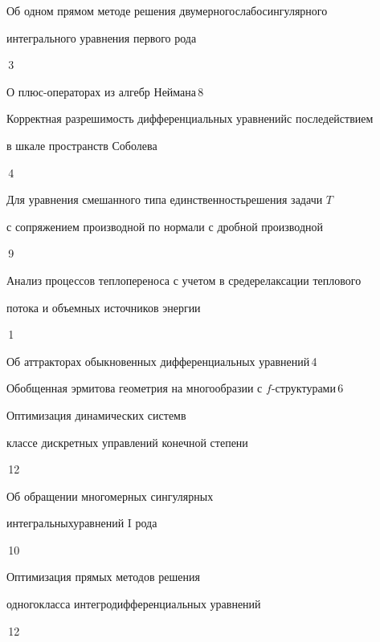 {Об одном прямом методе решения двумерного\newline слабосингулярного 


интегрального уравнения первого рода}{\No\,3}




{О плюс-операторах из алгебр Неймана}{\No\,8}




{Корректная разрешимость дифференциальных уравнений\newline с последействием


в шкале пространств Соболева}{\No\,4}




{Для уравнения смешанного типа единственность\newline решения задачи $T$ 


с сопряжением производной по нормали с дробной производной}{\No\,9}




{Анализ процессов теплопереноса с учетом в среде\newline релаксации теплового


потока и объемных источников энергии}{\No\,1}




{Об аттракторах обыкновенных дифференциальных уравнений}{\No\,4}




{Обобщенная эрмитова геометрия на многообразии с $f$-структурами}{\No\,6}




{Оптимизация динамических систем\newline в


классе дискретных управлений конечной степени}{\No\,12}




{Об обращении многомерных сингулярных


интегральных\newline уравнений I рода}{\No\,10}




{Оптимизация прямых методов решения


одного\newline класса интегродифференциальных уравнений}{\No\,12}


